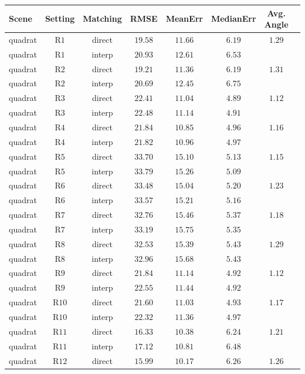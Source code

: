 \begin{appendix}
\begin{table}[tb]
	\centering
		\begin{tabular}{lccccccc}
Scene & Setting & Matching & RMSE & MeanErr & MedianErr & Avg. Angle \\
\hline  \hline
quadrat & R$1$ & direct & $19.58$ & $11.66$ & $6.19$ & $1.29$ & \\
quadrat & R$1$ & interp & $20.93$ & $12.61$ & $6.53$ &  & \\
quadrat & R$2$ & direct & $19.21$ & $11.36$ & $6.19$ & $1.31$ & \\
quadrat & R$2$ & interp & $20.69$ & $12.45$ & $6.75$ &  & \\
quadrat & R$3$ & direct & $22.41$ & $11.04$ & $4.89$ & $1.12$ & \\
quadrat & R$3$ & interp & $22.48$ & $11.14$ & $4.91$ &  & \\
quadrat & R$4$ & direct & $21.84$ & $10.85$ & $4.96$ & $1.16$ & \\
quadrat & R$4$ & interp & $21.82$ & $10.96$ & $4.97$ &  & \\
quadrat & R$5$ & direct & $33.70$ & $15.10$ & $5.13$ & $1.15$ & \\
quadrat & R$5$ & interp & $33.79$ & $15.26$ & $5.09$ &  & \\
quadrat & R$6$ & direct & $33.48$ & $15.04$ & $5.20$ & $1.23$ & \\
quadrat & R$6$ & interp & $33.57$ & $15.21$ & $5.16$ &  & \\
quadrat & R$7$ & direct & $32.76$ & $15.46$ & $5.37$ & $1.18$ & \\
quadrat & R$7$ & interp & $33.19$ & $15.75$ & $5.35$ &  & \\
quadrat & R$8$ & direct & $32.53$ & $15.39$ & $5.43$ & $1.29$ & \\
quadrat & R$8$ & interp & $32.96$ & $15.68$ & $5.43$ &  & \\
quadrat & R$9$ & direct & $21.84$ & $11.14$ & $4.92$ & $1.12$ & \\
quadrat & R$9$ & interp & $22.55$ & $11.44$ & $4.92$ &  & \\
quadrat & R$10$ & direct & $21.60$ & $11.03$ & $4.93$ & $1.17$ & \\
quadrat & R$10$ & interp & $22.32$ & $11.36$ & $4.97$ &  & \\
quadrat & R$11$ & direct & $16.33$ & $10.38$ & $6.24$ & $1.21$ & \\
quadrat & R$11$ & interp & $17.12$ & $10.81$ & $6.48$ &  & \\
quadrat & R$12$ & direct & $15.99$ & $10.17$ & $6.26$ & $1.26$ & \\

\end{tabular}
\end{table}
\end{appendix}
